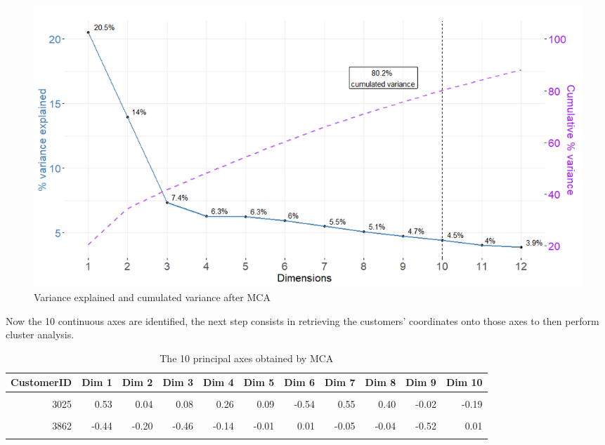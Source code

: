 \documentclass[
]{book}
\begin{document}
\begin{figure}

{\centering \includegraphics[width=15.14in]{./imgs/mca_screeplot} 

}

\caption{Variance explained and cumulated variance after MCA}\label{fig:mcascreeplot}
\end{figure}

Now the 10 continuous axes are identified, the next step consists in retrieving the customers' coordinates onto those axes to then perform cluster analysis.

\begin{table}[H]

\caption{\label{tab:unnamed-chunk-23}The 10 principal axes obtained by MCA}
\centering
\begin{tabular}[t]{rrrrrrrrrrr}
\toprule
CustomerID & Dim 1 & Dim 2 & Dim 3 & Dim 4 & Dim 5 & Dim 6 & Dim 7 & Dim 8 & Dim 9 & Dim 10\\
\midrule
\cellcolor{gray!6}{4197} & \cellcolor{gray!6}{-0.15} & \cellcolor{gray!6}{-0.02} & \cellcolor{gray!6}{-0.30} & \cellcolor{gray!6}{-0.03} & \cellcolor{gray!6}{0.03} & \cellcolor{gray!6}{-0.29} & \cellcolor{gray!6}{-0.61} & \cellcolor{gray!6}{0.01} & \cellcolor{gray!6}{-0.04} & \cellcolor{gray!6}{0.10}\\
3025 & 0.53 & 0.04 & 0.08 & 0.26 & 0.09 & -0.54 & 0.55 & 0.40 & -0.02 & -0.19\\
\cellcolor{gray!6}{6585} & \cellcolor{gray!6}{-0.04} & \cellcolor{gray!6}{-0.24} & \cellcolor{gray!6}{-0.15} & \cellcolor{gray!6}{0.40} & \cellcolor{gray!6}{0.07} & \cellcolor{gray!6}{-0.20} & \cellcolor{gray!6}{0.18} & \cellcolor{gray!6}{-0.25} & \cellcolor{gray!6}{0.02} & \cellcolor{gray!6}{0.07}\\
3862 & -0.44 & -0.20 & -0.46 & -0.14 & -0.01 & 0.01 & -0.05 & -0.04 & -0.52 & 0.01\\
\cellcolor{gray!6}{300} & \cellcolor{gray!6}{0.21} & \cellcolor{gray!6}{-0.37} & \cellcolor{gray!6}{0.11} & \cellcolor{gray!6}{0.00} & \cellcolor{gray!6}{0.00} & \cellcolor{gray!6}{-0.41} & \cellcolor{gray!6}{-0.54} & \cellcolor{gray!6}{-0.13} & \cellcolor{gray!6}{0.36} & \cellcolor{gray!6}{0.06}\\
\bottomrule
\end{tabular}
\end{table}
\end{document}
